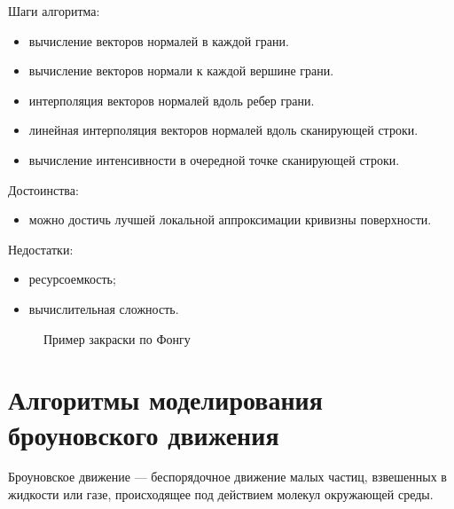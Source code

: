 Шаги алгоритма:

\begin{itemize}
	\item вычисление векторов нормалей в каждой грани.
	\item вычисление векторов нормали к каждой вершине грани.
	\item интерполяция векторов нормалей вдоль ребер грани.
	\item линейная интерполяция векторов нормалей вдоль сканирующей строки.
	\item вычисление интенсивности в очередной точке сканирующей строки.
\end{itemize}

Достоинства:
\begin{itemize}
	\item можно достичь лучшей локальной аппроксимации кривизны поверхности.
\end{itemize}

Недостатки:
\begin{itemize}
	\item ресурсоемкость;
	\item вычислительная сложность.
\end{itemize}


\begin{figure}[ph!]
	\caption{Пример закраски по Фонгу}
	\label{fig:draw_phong}
\end{figure}

\section{Алгоритмы моделирования броуновского движения}

Броуновское движение --- беспорядочное движение малых частиц, взвешенных в жидкости или газе, происходящее под действием молекул окружающей среды. 

